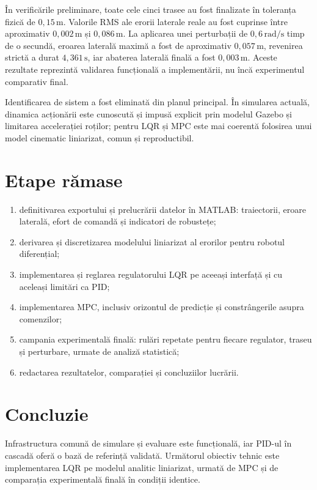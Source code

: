 \documentclass[11pt,a4paper]{article}
\begin{document}
În verificările preliminare, toate cele cinci trasee au fost finalizate în
toleranța fizică de $0{,}15\,\mathrm{m}$. Valorile RMS ale erorii laterale reale
au fost cuprinse între aproximativ $0{,}002\,\mathrm{m}$ și
$0{,}086\,\mathrm{m}$. La aplicarea unei perturbații de
$0{,}6\,\mathrm{rad/s}$ timp de o secundă, eroarea laterală maximă a fost de
aproximativ $0{,}057\,\mathrm{m}$, revenirea strictă a durat
$4{,}361\,\mathrm{s}$, iar abaterea laterală finală a fost
$0{,}003\,\mathrm{m}$. Aceste rezultate reprezintă validarea funcțională a
implementării, nu încă experimentul comparativ final.

Identificarea de sistem a fost eliminată din planul principal. În simularea
actuală, dinamica acționării este cunoscută și impusă explicit prin modelul
Gazebo și limitarea accelerației roților; pentru LQR și MPC este mai coerentă
folosirea unui model cinematic liniarizat, comun și reproductibil.

\section*{Etape rămase}

\begin{enumerate}
    \item definitivarea exportului și prelucrării datelor în MATLAB: traiectorii,
    eroare laterală, efort de comandă și indicatori de robustețe;
    \item derivarea și discretizarea modelului liniarizat al erorilor pentru
    robotul diferențial;
    \item implementarea și reglarea regulatorului LQR pe aceeași interfață și cu
    aceleași limitări ca PID;
    \item implementarea MPC, inclusiv orizontul de predicție și constrângerile
    asupra comenzilor;
    \item campania experimentală finală: rulări repetate pentru fiecare
    regulator, traseu și perturbare, urmate de analiză statistică;
    \item redactarea rezultatelor, comparației și concluziilor lucrării.
\end{enumerate}

\section*{Concluzie}

Infrastructura comună de simulare și evaluare este funcțională, iar PID-ul în
cascadă oferă o bază de referință validată. Următorul obiectiv tehnic este
implementarea LQR pe modelul analitic liniarizat, urmată de MPC și de comparația
experimentală finală în condiții identice.
\end{document}
